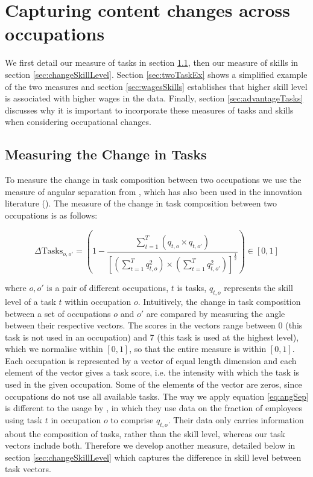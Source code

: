 \documentclass[12pt,authoryear]{elsarticle}
\begin{document}
	
	
	\section{Capturing content changes across occupations}
	\label{sec:measures}
	We first detail our measure of tasks in section \ref{sec:taskDistance}, then our measure of skills in section \ref{sec:changeSkillLevel}. Section \ref{sec:twoTaskEx} shows a simplified example of the two measures and section \ref{sec:wagesSkills} establishes that higher skill level is associated with higher wages in the data. Finally, section \ref{sec:advantageTasks} discusses why it is important to incorporate these measures of tasks and skills when considering occupational changes.
	\subsection{Measuring the Change in Tasks}
	\label{sec:taskDistance}
	To measure the change in task composition between two occupations we use the measure of angular separation from \cite{Gathmann2010}, which has also been used in the innovation literature (\cite{Jaffe1986}). The measure of the change in task composition between two occupations is as follows:
	
	
	\begin{equation}
	\label{eq:angSep}
	\Delta \text{Tasks}_{o,o'} = \left(1 - \frac{\sum_{t=1}^{T}(q_{t,o}\times q_{t,o'})}{\left[(\sum_{t=1}^{T}q_{t,o}^{2})\times(\sum_{t=1}^{T}q_{t,o'}^{2})\right]^{\frac{1}{2}}}\right)   \in [0,1]
	\end{equation}
	
	\noindent where $o,o'$ is a pair of different occupations, $t$ is tasks, $q_{t,o}$ represents the skill level of a task $t$ within occupation $o$. Intuitively, the change in task composition between a set of occupations $o$ and $o'$ are compared by measuring the angle between their respective vectors. The scores in the vectors range between 0 (this task is not used in an occupation) and 7 (this task is used at the highest level), which we normalise within $[0,1]$, so that the entire measure is within $[0,1]$. Each occupation is represented by a vector of equal length dimension and each element of the vector gives a task score, i.e. the intensity with which the task is used in the given occupation. Some of the elements of the vector are zeros, since occupations do not use all available tasks. 
	The way we apply equation \ref{eq:angSep} is different to the usage by \cite{Gathmann2010}, in which they use data on the fraction of employees using task $t$ in occupation $o$ to comprise $q_{t,o}$. Their data only carries information about the composition of tasks, rather than the skill level, whereas our task vectors include both. Therefore we develop another measure, detailed below in section \ref{sec:changeSkillLevel} which captures the difference in skill level between task vectors.
	
\end{document}
